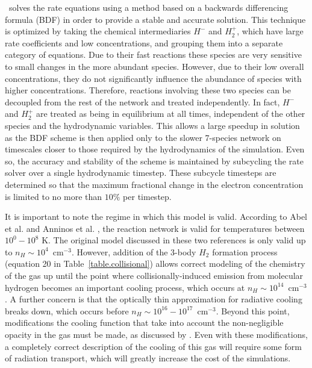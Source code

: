 \enzo\ solves the rate equations using a method based on a backwards differencing 
formula (BDF) in order to provide a stable and accurate solution.  This technique is
optimized by taking the chemical intermediaries $H^-$ and $H_2^+$, which have 
large rate coefficients and low concentrations, and grouping them into a separate
category of equations.  Due to their fast reactions these species are very sensitive
to small changes in the more abundant species.  However, due to their low overall
concentrations, they do not significantly influence the abundance of species with
higher concentrations.  Therefore, reactions involving these two species can be
decoupled from the rest of the network and treated independently.  In fact, $H^-$ 
and $H_2^+$ are treated as being in equilibrium at all times, independent of 
the other species and the hydrodynamic variables.  This allows a large speedup
in solution as the BDF scheme is then applied only to the slower 7-species network
on timescales closer to those required by the hydrodynamics of the simulation.
Even so, the accuracy and stability of the scheme is maintained by subcycling the 
rate solver over a single hydrodynamic timestep.  These subcycle timesteps are 
determined so that the maximum fractional change in the electron concentration is
limited to no more than $10\%$ per timestep.

It is important to note the regime in which this model is valid.  According to Abel et al. and
Anninos et al. \citep{abel97,anninos97}, the reaction network is valid for temperatures
between $10^0 - 10^8$ K.  The original model discussed in these two references is only
valid up to $n_H \sim 10^4$~cm$^{-3}$.  However, addition of the 3-body $H_2$ formation
process (equation 20 in Table~\ref{table.collisional}) allows 
correct modeling of the chemistry of the gas up
until the point where collisionally-induced emission from molecular hydrogen becomes an important
cooling process, which occurs at $n_H \sim 10^{14}$~cm$^{-3}$.  A further concern is that
the optically thin approximation for radiative cooling breaks down, which
occurs before $n_H \sim 10^{16} - 10^{17}$~cm$^{-3}$.  Beyond this point, 
modifications the cooling function that take into account the non-negligible
opacity in the gas must be made, as discussed by \citet{2004MNRAS.348.1019R}. 
Even with these modifications, a completely correct description of the cooling of
this gas will require some form of radiation transport, which will greatly 
increase the cost of the simulations.

